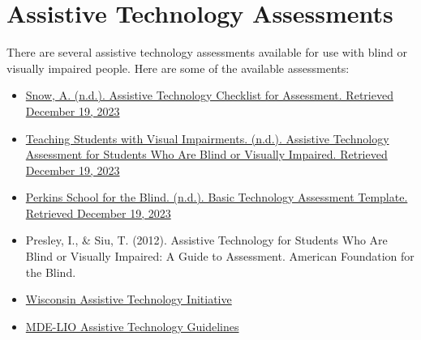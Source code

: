 \pagebreak \hypertarget{trouble4}{}\section[Assistive Technology Assessments]{Assistive Technology Assessments}\label{trouble4}
There are several assistive technology assessments available for use with blind or visually impaired people. Here are some of the available assessments:
\begin{itemize}[leftmargin=*]
 \item \href{https://www.teachingvisuallyimpaired.com/assistive-technology-assessment.html}{Snow, A. (n.d.). Assistive Technology Checklist for Assessment. Retrieved December 19, 2023} 
 \item \href{http://www.teachingvisuallyimpaired.com/uploads/1/4/1/2/14122361/at\_assessment\_revised.pdf}{Teaching Students with Visual Impairments. (n.d.). Assistive Technology Assessment for Students Who Are Blind or Visually Impaired. Retrieved December 19, 2023}
 \item \href{https://www.perkins.org/sites/elearning.perkinsdev1.org/files/Basic\%20Technology\%20Assessment\%20Template\_0\_0.docx}{Perkins School for the Blind. (n.d.). Basic Technology Assessment Template. Retrieved December 19, 2023}
 \item Presley, I., \& Siu, T. (2012). Assistive Technology for Students Who Are Blind or Visually Impaired: A Guide to Assessment. American Foundation for the Blind.
 \item \href{https://www.wati.org/free-publications/assessing-students-needs-for-assistive-technology/}{Wisconsin Assistive Technology Initiative}
 \item \href{https://mdelio.org/blind-visually-impaired/educator-support/assistive-technology-guidelines}{MDE-LIO Assistive Technology Guidelines}
 
 
\end{itemize}